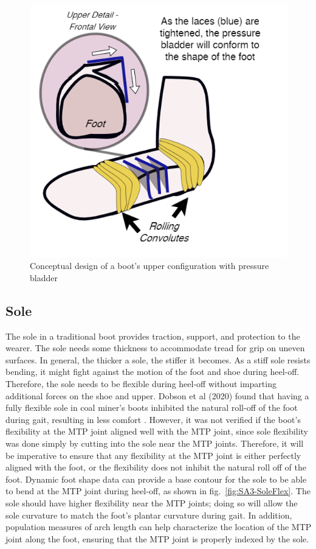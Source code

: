 \documentclass[defaultstyle,11pt]{comps}
\begin{document}
\begin{figure}
\hypertarget{fig:SA3-Upper}{%
\centering
\includegraphics{../fig/SA3/Upper.png}
\caption{Conceptual design of a boot's upper configuration with pressure bladder}\label{fig:SA3-Upper}
}
\end{figure}

\hypertarget{sole}{%
\subsection{Sole}\label{sole}}

The sole in a traditional boot provides traction, support, and protection to the wearer.
The sole needs some thickness to accommodate tread for grip on uneven surfaces.
In general, the thicker a sole, the stiffer it becomes.
As a stiff sole resists bending, it might fight against the motion of the foot and shoe during heel-off.
Therefore, the sole needs to be flexible during heel-off without imparting additional forces on the shoe and upper.
Dobson et al (2020) found that having a fully flexible sole in coal miner's boots inhibited the natural roll-off of the foot during gait, resulting in less comfort \citep{Dobson2020}.
However, it was not verified if the boot's flexibility at the MTP joint aligned well with the MTP joint, since sole flexibility was done simply by cutting into the sole near the MTP joints.
Therefore, it will be imperative to ensure that any flexibility at the MTP joint is either perfectly aligned with the foot, or the flexibility does not inhibit the natural roll off of the foot.
Dynamic foot shape data can provide a base contour for the sole to be able to bend at the MTP joint during heel-off, as shown in fig.~\ref{fig:SA3-SoleFlex}.
The sole should have higher flexibility near the MTP joints; doing so will allow the sole curvature to match the foot's plantar curvature during gait.
In addition, population measures of arch length can help characterize the location of the MTP joint along the foot, ensuring that the MTP joint is properly indexed by the sole.
\end{document}
